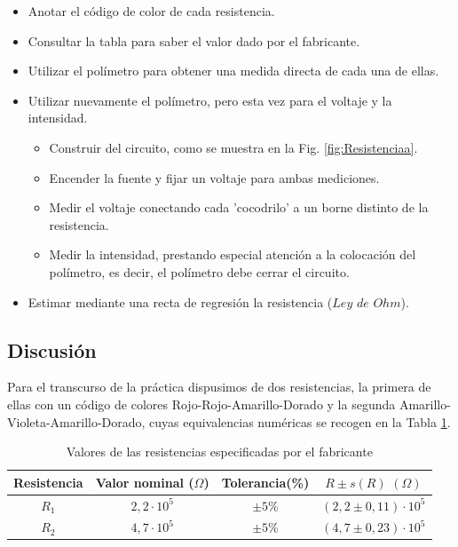 \documentclass[11pt]{report}
\begin{document}
\begin{refsection}
\begin{itemize}
    \item Anotar el código de color de cada resistencia.
    \item Consultar la tabla para saber el valor dado por el fabricante.
    \item Utilizar el polímetro para obtener una medida directa de cada una de ellas.
    \item Utilizar nuevamente el polímetro, pero esta vez para el voltaje y la intensidad.
    \begin{itemize}
        \item Construir del circuito, como se muestra en la Fig. \ref{fig:Resistenciaa}.
        \item Encender la fuente y fijar un voltaje para ambas mediciones.
        \item Medir el voltaje conectando cada 'cocodrilo' a un borne distinto de la resistencia.
        \item Medir la intensidad, prestando especial atención a la colocación del polímetro, 
        es decir, el polímetro debe cerrar el circuito.
    \end{itemize}
    \item Estimar mediante una recta de regresión la resistencia ($Ley$ $de$ $Ohm$).
\end{itemize}

\subsection{Discusión}

Para el transcurso de la práctica dispusimos de dos resistencias, la primera de ellas con un código de colores
Rojo-Rojo-Amarillo-Dorado y la segunda Amarillo-Violeta-Amarillo-Dorado, cuyas equivalencias numéricas se 
recogen en la Tabla \ref{tab:Resistencias}.

\begin{table}[H]
\centering
\begin{tabular}{|c|c|c|c|}
\hline
Resistencia & Valor nominal ($\Omega$) & Tolerancia(\%) & $R \pm s(R) \hspace{4pt} (\Omega)$ \\
\hline
$R_1$ & $2,2\cdot 10^5$ & $\pm 5 \% $& $(2,2 \pm 0,11)\cdot 10^5$\\
$R_2$ & $4,7\cdot 10^5$ & $\pm 5 \% $ & $(4,7 \pm 0,23)\cdot 10^5$\\
\hline
\end{tabular}
\caption{Valores de las resistencias especificadas por el fabricante}
\label{tab:Resistencias}
\end{table}


\end{refsection}
\end{document}
